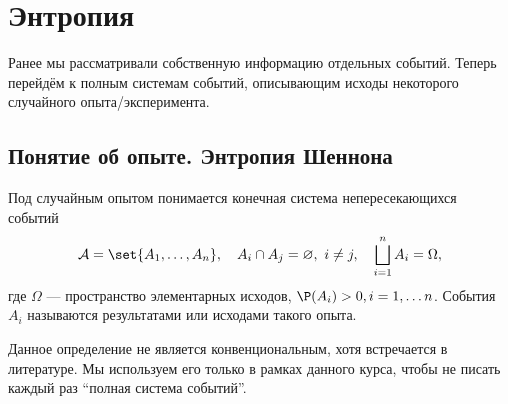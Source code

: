 %
%
%
%


\section{Энтропия}
\localtableofcontents

\vspace{3ex}

Ранее мы рассматривали собственную информацию отдельных событий. Теперь перейдём к полным системам событий, описывающим исходы некоторого случайного опыта/эксперимента.

\subsection{Понятие об опыте. Энтропия Шеннона}
\begin{definition*}
Под случайным опытом понимается конечная система непересекающихся событий
\[
\mathcal{A} = \set{A_1, \dots, A_n}, \quad A_i \cap A_j = \varnothing, \ i \neq j, \quad \bigsqcup_{i=1}^n A_i = \Omega,
\]
где \(\Omega\) --- пространство элементарных исходов, \(\P(A_i) > 0, i = 1, \ldots n \). События $A_i$ называются результатами или исходами такого опыта.
\end{definition*}
\begin{remark}
    Данное определение не является конвенциональным, хотя встречается в литературе. Мы используем его только в рамках данного курса, чтобы не писать каждый раз \enquote{полная система событий}.
\end{remark}


